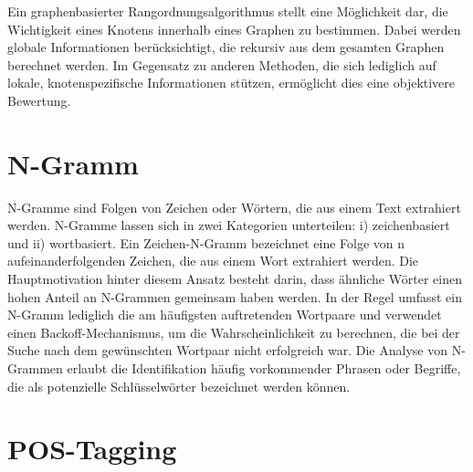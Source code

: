 Ein graphenbasierter Rangordnungsalgorithmus stellt eine Möglichkeit dar, die Wichtigkeit eines Knotens innerhalb eines Graphen zu bestimmen. Dabei werden globale Informationen berücksichtigt, die rekursiv aus dem gesamten Graphen berechnet werden. Im Gegensatz zu anderen Methoden, die sich lediglich auf lokale, knotenspezifische Informationen stützen, ermöglicht dies eine objektivere Bewertung.\cite{mihalcea2004textrank}

\section{N-Gramm}
N-Gramme sind Folgen von Zeichen oder Wörtern, die aus einem Text extrahiert werden. N-Gramme lassen sich in zwei Kategorien unterteilen: i) zeichenbasiert und ii) wortbasiert. Ein Zeichen-N-Gramm bezeichnet eine Folge von n aufeinanderfolgenden Zeichen, die aus einem Wort extrahiert werden. Die Hauptmotivation hinter diesem Ansatz besteht darin, dass ähnliche Wörter einen hohen Anteil an N-Grammen gemeinsam haben werden. In der Regel umfasst ein N-Gramm lediglich die am häufigsten auftretenden Wortpaare und verwendet einen Backoff-Mechanismus, um die Wahrscheinlichkeit zu berechnen, die bei der Suche nach dem gewünschten Wortpaar nicht erfolgreich war. \cite{majumder2002n} Die Analyse von N-Grammen erlaubt die Identifikation häufig vorkommender Phrasen oder Begriffe, die als potenzielle Schlüsselwörter bezeichnet werden können.

\section{POS-Tagging}

